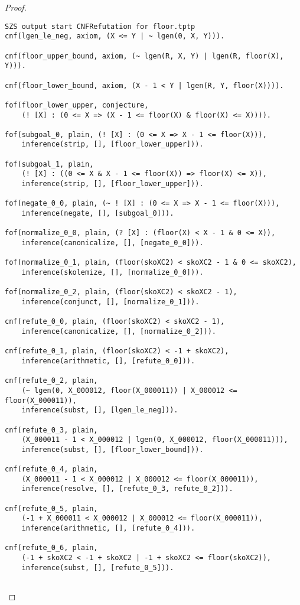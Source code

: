 \begin{proof}
\begin{verbatim}
SZS output start CNFRefutation for floor.tptp
cnf(lgen_le_neg, axiom, (X <= Y | ~ lgen(0, X, Y))).

cnf(floor_upper_bound, axiom, (~ lgen(R, X, Y) | lgen(R, floor(X), Y))).

cnf(floor_lower_bound, axiom, (X - 1 < Y | lgen(R, Y, floor(X)))).

fof(floor_lower_upper, conjecture,
    (! [X] : (0 <= X => (X - 1 <= floor(X) & floor(X) <= X)))).

fof(subgoal_0, plain, (! [X] : (0 <= X => X - 1 <= floor(X))),
    inference(strip, [], [floor_lower_upper])).

fof(subgoal_1, plain,
    (! [X] : ((0 <= X & X - 1 <= floor(X)) => floor(X) <= X)),
    inference(strip, [], [floor_lower_upper])).

fof(negate_0_0, plain, (~ ! [X] : (0 <= X => X - 1 <= floor(X))),
    inference(negate, [], [subgoal_0])).

fof(normalize_0_0, plain, (? [X] : (floor(X) < X - 1 & 0 <= X)),
    inference(canonicalize, [], [negate_0_0])).

fof(normalize_0_1, plain, (floor(skoXC2) < skoXC2 - 1 & 0 <= skoXC2),
    inference(skolemize, [], [normalize_0_0])).

fof(normalize_0_2, plain, (floor(skoXC2) < skoXC2 - 1),
    inference(conjunct, [], [normalize_0_1])).

cnf(refute_0_0, plain, (floor(skoXC2) < skoXC2 - 1),
    inference(canonicalize, [], [normalize_0_2])).

cnf(refute_0_1, plain, (floor(skoXC2) < -1 + skoXC2),
    inference(arithmetic, [], [refute_0_0])).

cnf(refute_0_2, plain,
    (~ lgen(0, X_000012, floor(X_000011)) | X_000012 <= floor(X_000011)),
    inference(subst, [], [lgen_le_neg])).

cnf(refute_0_3, plain,
    (X_000011 - 1 < X_000012 | lgen(0, X_000012, floor(X_000011))),
    inference(subst, [], [floor_lower_bound])).

cnf(refute_0_4, plain,
    (X_000011 - 1 < X_000012 | X_000012 <= floor(X_000011)),
    inference(resolve, [], [refute_0_3, refute_0_2])).

cnf(refute_0_5, plain,
    (-1 + X_000011 < X_000012 | X_000012 <= floor(X_000011)),
    inference(arithmetic, [], [refute_0_4])).

cnf(refute_0_6, plain,
    (-1 + skoXC2 < -1 + skoXC2 | -1 + skoXC2 <= floor(skoXC2)),
    inference(subst, [], [refute_0_5])).


\end{verbatim}
\end{proof}
